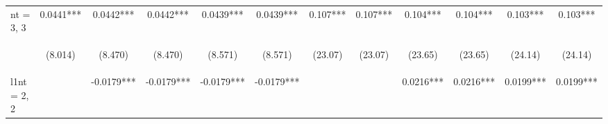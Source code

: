 \documentclass[]{article}
\begin{document}
\begin{center}
\begin{tabular}{lccccccccccc}
nt = 3, 3 & 0.0441*** & 0.0442*** & 0.0442*** & 0.0439*** & 0.0439*** & 0.107*** & 0.107*** & 0.104*** & 0.104*** & 0.103*** & 0.103*** \\
\vspace{4pt} & \begin{footnotesize}(8.014)\end{footnotesize} & \begin{footnotesize}(8.470)\end{footnotesize} & \begin{footnotesize}(8.470)\end{footnotesize} & \begin{footnotesize}(8.571)\end{footnotesize} & \begin{footnotesize}(8.571)\end{footnotesize} & \begin{footnotesize}(23.07)\end{footnotesize} & \begin{footnotesize}(23.07)\end{footnotesize} & \begin{footnotesize}(23.65)\end{footnotesize} & \begin{footnotesize}(23.65)\end{footnotesize} & \begin{footnotesize}(24.14)\end{footnotesize} & \begin{footnotesize}(24.14)\end{footnotesize} \\
l1nt = 2, 2 &  & -0.0179*** & -0.0179*** & -0.0179*** & -0.0179*** &  &  & 0.0216*** & 0.0216*** & 0.0199*** & 0.0199*** \\

\end{tabular}
\end{center}
\end{document}
